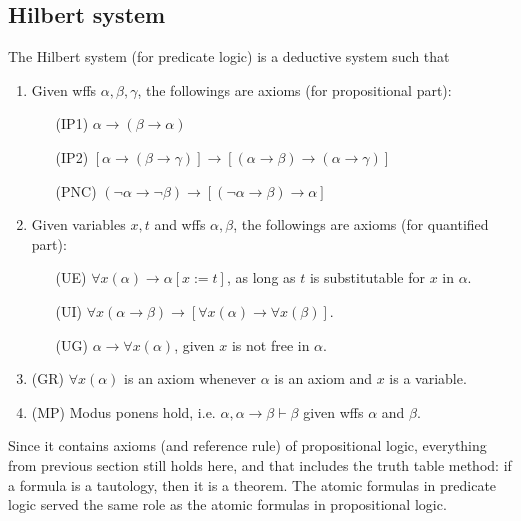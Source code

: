 \documentclass{treatise}
\begin{document}
\subsection{Hilbert system}
The Hilbert system (for predicate logic) is a deductive system such that
\begin{enumerate}
    \item Given wffs $\alpha, \beta, \gamma$, the followings are axioms (for propositional part):
    \begin{enumerate}
        \item[(IP1)] \label{EHPRL-A-IP1} $\alpha \to (\beta \to \alpha)$
        \item[(IP2)] \label{EHPRL-A-IP2} $[\alpha \to (\beta \to \gamma)] \to [(\alpha \to \beta) \to (\alpha \to \gamma)]$
        \item[(PNC)] \label{EHPRL-A-PNC} $(\neg \alpha \to \neg \beta) \to [(\neg \alpha \to \beta) \to \alpha]$
    \end{enumerate}
    \item Given variables $x, t$ and wffs $\alpha, \beta$, the followings are axioms (for quantified part):
    \begin{enumerate}
        \item[(UE)] \label{EHPRL-A-UE} $\forall x (\alpha) \to \alpha[x := t]$, as long as $t$ is substitutable for $x$ in $\alpha$.
        \item[(UI)] \label{EHPRL-A-UI} $\forall x (\alpha \to \beta) \to [\forall x (\alpha) \to \forall x (\beta)]$.
        \item[(UG)] \label{EHPRL-A-UG} $\alpha \to \forall x (\alpha)$, given $x$ is not free in $\alpha$.
    \end{enumerate}
    \item (GR) \label{EHPRL-A-GR} $\forall x (\alpha)$ is an axiom whenever $\alpha$ is an axiom and $x$ is a variable.
    \item (MP) \label{EHPRL-R-MP} Modus ponens hold, i.e. $\alpha, \alpha \to \beta \vdash \beta$ given wffs $\alpha$ and $\beta$.
\end{enumerate}
Since it contains axioms (and reference rule) of propositional logic, everything from previous section still holds here, and that includes the truth table method: if a formula is a tautology, then it is a theorem. The atomic formulas in predicate logic served the same role as the atomic formulas in propositional logic.
\end{document}
